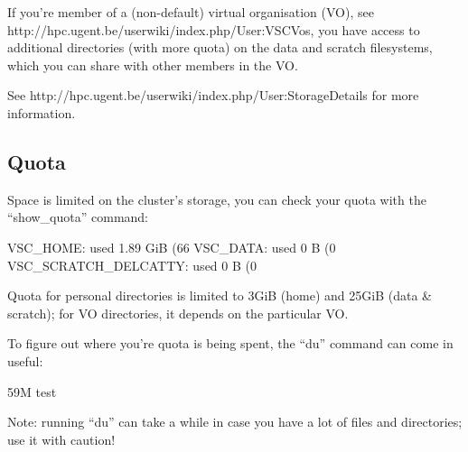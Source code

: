 If you're member of a (non-default) virtual organisation (VO), see
http://hpc.ugent.be/userwiki/index.php/User:VSCVos, you have access to
additional directories (with more quota) on the data and scratch filesystems,
which you can share with other members in the VO.

See http://hpc.ugent.be/userwiki/index.php/User:StorageDetails for more
information.

\subsection{Quota}

Space is limited on the cluster's storage, you can check your quota with the
``show\_quota'' command:

\begin{prompt}
VSC_HOME: used 1.89 GiB (66%
VSC_DATA: used 0 B (0%
VSC_SCRATCH_DELCATTY: used 0 B (0%
\end{prompt}

Quota for personal directories is limited to 3GiB (home) and 25GiB (data &
scratch); for VO directories, it depends on the particular VO.

To figure out where you're quota is being spent, the ``du'' command can come in
useful:

\begin{prompt}
59M   test
\end{prompt}

Note: running ``du'' can take a while in case you have a lot of files and
directories; use it with caution!



